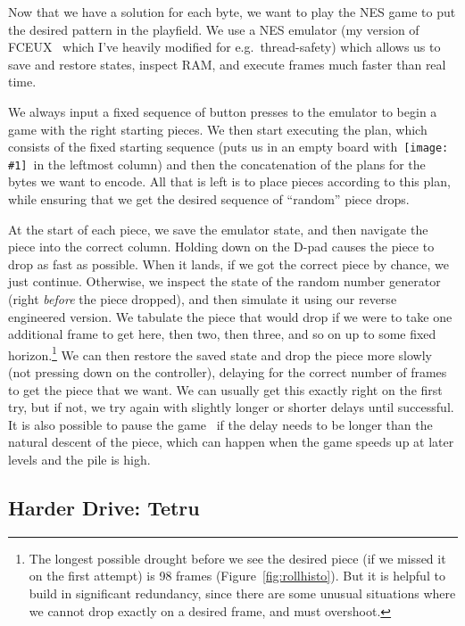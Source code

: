 \documentclass[twocolumn]{article}
\newcommand\tetrispiece[1]{\,\texttt{[image: \#1]}\hspace{0.1em}}
\newcommand\svert{\tetrispiece{s_vert}}
\begin{document}
Now that we have a solution for each byte, we want to play the NES
game to put the desired pattern in the playfield. We use a NES
emulator (my version of FCEUX~\cite{fceux} which I've heavily modified
for e.g.~thread-safety) which allows us to save and restore states,
inspect RAM, and execute frames much faster than real time.

We always input a fixed sequence of button presses to the emulator to
begin a game with the right starting pieces. We then start executing
the plan, which consists of the fixed starting sequence (puts us in an
empty board with \svert\ in the leftmost column) and then the
concatenation of the plans for the bytes we want to encode. All that
is left is to place pieces according to this plan, while ensuring that
we get the desired sequence of ``random'' piece drops.

At the start of each piece, we save the emulator state, and then
navigate the piece into the correct column. Holding down on the D-pad
causes the piece to drop as fast as possible. When it lands, if we got
the correct piece by chance, we just continue. Otherwise, we inspect
the state of the random number generator (right {\em before} the piece
dropped), and then simulate it using our reverse engineered version.
We tabulate the piece that would drop if we were to take one
additional frame to get here, then two, then three, and so on up to
some fixed horizon.\footnote{The longest possible drought before we
  see the desired piece (if we missed it on the first attempt) is 98
  frames (Figure~\ref{fig:rollhisto}). But it is helpful to build in
  significant redundancy, since there are some unusual situations
  where we cannot drop exactly on a desired frame, and must
  overshoot.} We can then restore the saved state and drop the piece
more slowly (not pressing down on the controller), delaying for the
correct number of frames to get the piece that we want. We can usually
get this exactly right on the first try, but if not, we try again with
slightly longer or shorter delays until successful. It is also
possible to pause the game~\cite{murphy2013first} if the delay needs
to be longer than the natural descent of the piece, which can happen
when the game speeds up at later levels and the pile is high.

\subsection{Harder Drive: Tetru}
\end{document}
